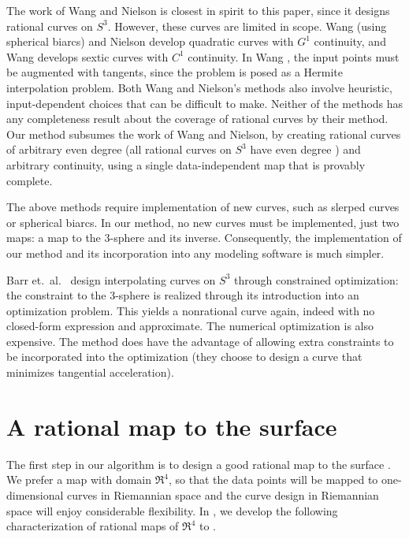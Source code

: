 The work of Wang \cite{wang93, wang94} and Nielson \cite{nielson93}
is closest in spirit to this paper, since it designs rational curves on $S^3$.
However, these curves are limited in scope.
Wang \cite{wang93,wang94} (using spherical biarcs) 
and Nielson \cite{nielson93} develop quadratic curves
with $G^1$ continuity, and Wang \cite{wang94} develops sextic curves
with $C^1$ continuity.
In Wang \cite{wang93,wang94}, the input points must be augmented with 
tangents, since the problem is posed as a Hermite interpolation problem.
Both Wang and Nielson's methods also involve heuristic, input-dependent choices 
that can be difficult to make.
Neither of the methods has any completeness result about the
coverage of rational curves by their method.
Our method subsumes the work of Wang and Nielson, 
by creating rational curves of arbitrary
even degree (all rational curves on $S^3$ have even degree \cite{wang94}) 
and arbitrary continuity, using a single data-independent map that is provably complete.

The above methods require implementation of new curves,
such as slerped curves or spherical biarcs.
In our method, no new curves must be implemented, just two maps:
a map to the 3-sphere and its inverse.
Consequently, the implementation of our method and its incorporation
into any modeling software is much simpler.

Barr et.\ al.\ \cite{barr92} design interpolating curves on $S^3$ 
through constrained optimization: the constraint to the 3-sphere 
is realized through its introduction into an optimization problem.
This yields a nonrational curve again, indeed with no closed-form expression
and approximate.
The numerical optimization is also expensive.
The method does have the advantage of allowing extra constraints 
to be incorporated into the optimization (they choose to design a curve
that minimizes tangential acceleration).



\section{A rational map to the surface}
\label{sec:map}

The first step in our algorithm is to design a good rational map to the 
surface .
We prefer a map with domain $\Re^4$, so that the data points will be
mapped to one-dimensional curves in Riemannian space and the 
curve design in Riemannian space will enjoy considerable flexibility.
In \cite{jj98a}, we develop the following characterization of rational
maps of $\Re^4$ to .

